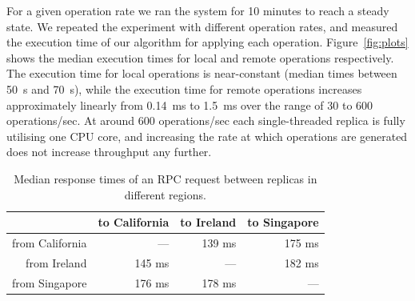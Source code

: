 \documentclass[sigplan,anonymous]{acmart}
\begin{document}
For a given operation rate we ran the system for 10 minutes to reach a steady state.
We repeated the experiment with different operation rates, and measured the execution time of our algorithm for applying each operation.
Figure~\ref{fig:plots} shows the median execution times for local and remote operations respectively.
The execution time for local operations is near-constant (median times between 50~{\textmu}s and 70~{\textmu}s), while the execution time for remote operations increases approximately linearly from 0.14~ms to 1.5~ms over the range of 30 to 600 operations/sec.
At around 600 operations/sec each single-threaded replica is fully utilising one CPU core, and increasing the rate at which operations are generated does not increase throughput any further.

\begin{table}
  \caption{Median response times of an RPC request between replicas in different regions.}
  \label{tab:rpc-times}
  \begin{tabular}{r|rrr}
    \toprule
                    & to California & to Ireland & to Singapore \\
    \midrule
    from California & ---           & 139 ms     & 175 ms       \\
    from Ireland    & 145 ms        & ---        & 182 ms       \\
    from Singapore  & 176 ms        & 178 ms     & ---          \\
    \bottomrule
\end{tabular}
\end{table}
\end{document}
